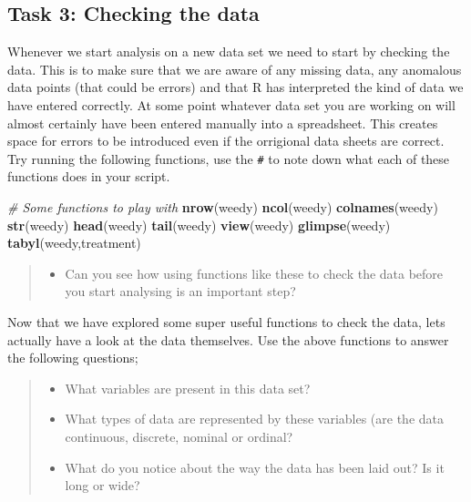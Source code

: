 \documentclass[
]{book}
\newenvironment{Shaded}{\begin{snugshade}}{\end{snugshade}}
\newcommand{\CommentTok}[1]{\textcolor[rgb]{0.56,0.35,0.01}{\textit{#1}}}
\newcommand{\FunctionTok}[1]{\textcolor[rgb]{0.13,0.29,0.53}{\textbf{#1}}}
\newcommand{\NormalTok}[1]{#1}
\providecommand{\tightlist}{%
  \setlength{\itemsep}{0pt}\setlength{\parskip}{0pt}}
\begin{document}
\hypertarget{checking-the-data}{%
\subsection{Task 3: Checking the data}\label{checking-the-data}}

Whenever we start analysis on a new data set we need to start by checking the data. This is to make sure that we are aware of any missing data, any anomalous data points (that could be errors) and that R has interpreted the kind of data we have entered correctly. At some point whatever data set you are working on will almost certainly have been entered manually into a spreadsheet. This creates space for errors to be introduced even if the orrigional data sheets are correct. Try running the following functions, use the \texttt{\#} to note down what each of these functions does in your script.

\begin{Shaded}
\begin{Highlighting}[]
\CommentTok{\# Some functions to play with}
\FunctionTok{nrow}\NormalTok{(weedy)}
\FunctionTok{ncol}\NormalTok{(weedy)}
\FunctionTok{colnames}\NormalTok{(weedy)}
\FunctionTok{str}\NormalTok{(weedy)}
\FunctionTok{head}\NormalTok{(weedy)}
\FunctionTok{tail}\NormalTok{(weedy)}
\FunctionTok{view}\NormalTok{(weedy)}
\FunctionTok{glimpse}\NormalTok{(weedy)}
\FunctionTok{tabyl}\NormalTok{(weedy,treatment)}
\end{Highlighting}
\end{Shaded}

\begin{quote}
\begin{itemize}
\tightlist
\item
  Can you see how using functions like these to check the data before you start analysing is an important step?
\end{itemize}
\end{quote}

Now that we have explored some super useful functions to check the data, lets actually have a look at the data themselves. Use the above functions to answer the following questions;

\begin{quote}
\begin{itemize}
\tightlist
\item
  What variables are present in this data set?
\item
  What types of data are represented by these variables (are the data continuous, discrete, nominal or ordinal?
\item
  What do you notice about the way the data has been laid out? Is it long or wide?
\end{itemize}
\end{quote}
\end{document}
